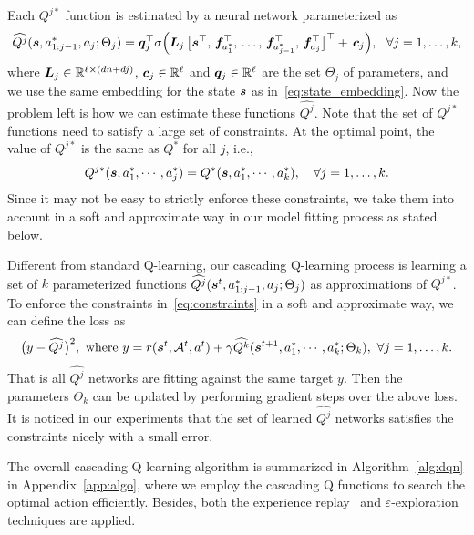 \documentclass{article} %
\begin{document}
Each $Q^{j*}$ function is estimated by a neural network parameterized as
\begin{equation}
    \widehat{Q^{j}}({\bm{s}}, a_{1:j-1}^*, a_j; \Theta_j) = {\bm{q}}_j^\top \sigma \Big( {\bm{L}}_j\,
        \big[
            {\bm{s}}^\top,\,  
            {\bm{f}}_{a_1^*}^\top,\, 
            \ldots,\,
            {\bm{f}}_{a_{j-1}^*}^\top,\,
            {\bm{f}}_{a_j}^\top
        \big]^\top
        +\, {\bm{c}}_j
    \Big),~~\forall j=1,\ldots,k,
\end{equation}
where {\small${\bm{L}}_j \in {\mathbb{R}}^{\ell\times(dn+dj)}$}, {\small${\bm{c}}_j \in {\mathbb{R}}^{\ell}$} and {\small${\bm{q}}_j \in {\mathbb{R}}^{\ell}$} are the set {\small$\Theta_j$} of parameters, and we use the same embedding for the state ${\bm{s}}$ as in~\eqref{eq:state_embedding}. Now the problem left is how we can estimate these functions {\small$\widehat{Q^{j}}$}. Note that the set of {\small$Q^{j*}$} functions need to satisfy a large set of constraints. At the optimal point, the value of $Q^{j*}$ is the same as $Q^*$ for all $j$, i.e., 
\begin{equation}
    \label{eq:constraints}
        Q^{j*}({\bm{s}}, a_1^*, \cdots, a_j^*) = Q^*({\bm{s}},a_1^*,\cdots,a_k^*),\quad \forall j=1,\ldots, k.
\end{equation}
Since it may not be easy to strictly enforce these constraints, we take them into account in a soft and approximate way in our model fitting process as stated below. 

Different from standard Q-learning, our cascading Q-learning process is learning a set of $k$ parameterized functions {\small$\widehat{Q^j}({\bm{s}}^t, a_{1:j-1}^*, a_j; \Theta_j)$} as approximations of {\small$Q^{j*}$}. To enforce the constraints in~\eqref{eq:constraints} in a soft and approximate way, we can define the loss as
\begin{equation}
\label{eq:loss}
\big(y- \widehat{Q^j} \big)^2,~\text{where}~y= r({\bm{s}}^t, {\mathcal{A}}^t, a^t) + \gamma \widehat{Q^{k}}({\bm{s}}^{t+1}, a_1^*,\cdots,a_k^*; \Theta_k),~ \forall j=1,\ldots,k.
\end{equation}
That is all {\small$\widehat{Q^j}$} networks are fitting against the same target $y$. Then the parameters {\small$\Theta_k$} can be updated by performing gradient steps over the above loss. It is noticed in our experiments that the set of learned {\small$\widehat{Q^j}$} networks satisfies the constraints nicely with a small error.

The overall cascading Q-learning algorithm is summarized in Algorithm~\ref{alg:dqn} in Appendix~\ref{app:algo}, where we employ the cascading Q functions to search the optimal action efficiently. Besides, both the experience replay~\citep{MniKavSilGraetal13} and $\varepsilon$-exploration techniques are applied. 
\end{document}
